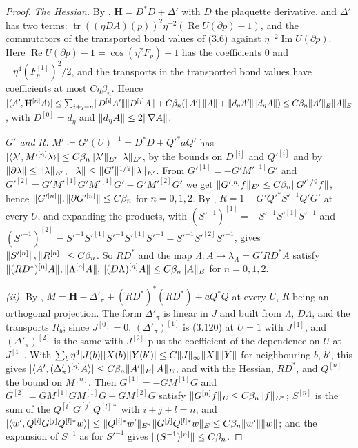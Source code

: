 \documentclass[11pt]{preprint}
\newcommand{\tr}{\operatorname{tr}}
\DeclarePairedDelimiter{\abs}{\lvert}{\rvert}
\DeclarePairedDelimiter{\norm}{\lVert}{\rVert}
\numberwithin{equation}{section}
\theoremstyle{definition}
\theoremstyle{remark}
\theoremstyle{plain}
\begin{document}
\begin{proof}
\emph{The Hessian.} By \cite[(3.10), p.~392]{BalabanPBG}, $\mathbf H = D^*D + \Delta'$ with $D$ the plaquette derivative, and $\Delta'$ has two terms: $\tr((\eta DA)(p))^2\eta^{-2}(\operatorname{Re}U(\partial p) - 1)$, and the commutators of the transported bond values of (3.6) against $\eta^{-2}\operatorname{Im}U(\partial p)$. Here $\operatorname{Re}U(\partial p) - 1 = \cos(\eta^2F_p) - 1$ has the coefficients $0$ and $-\eta^4(F_p^{[1]})^2/2$, and the transports in the transported bond values have coefficients at most $C\eta\beta_n$. Hence $\abs{\langle A', \mathbf H^{[n]}A \rangle} \leq \sum_{i+j=n}\norm{D^{[i]}A'}\norm{D^{[j]}A} + C\beta_n(\norm{A'}\norm{A} + \norm{d_\eta A'}\norm{d_\eta A}) \leq C\beta_n\norm{A'}_E\norm{A}_E$, with $D^{[0]} = d_\eta$ and $\norm{d_\eta A} \leq 2\norm{\nabla A}$.

\emph{$G'$ and $R$.} $M' \coloneqq G'(U)^{-1} = D^*D + Q'^*aQ'$ has $\abs{\langle\lambda', M'^{[n]}\lambda\rangle} \leq C\beta_n\norm{\lambda'}_{E'}\norm{\lambda}_{E'}$, by the bounds on $D^{[i]}$ and $Q'^{[i]}$ and by $\norm{\partial\lambda} \leq \norm{\lambda}_{E'}$, $\norm{\lambda} \leq \norm{G'}^{1/2}\norm{\lambda}_{E'}$. From $G'^{[1]} = -G'M'^{[1]}G'$ and $G'^{[2]} = G'M'^{[1]}G'M'^{[1]}G' - G'M'^{[2]}G'$ we get $\norm{G'^{[n]}f}_{E'} \leq C\beta_n\norm{G'^{1/2}f}$, hence $\norm{G'^{[n]}}, \norm{\partial G'^{[n]}} \leq C\beta_n$ for $n = 0, 1, 2$. By \cite[(3.25), p.~394]{BalabanPBG}, $R = 1 - G'Q'^*S'^{-1}Q'G'$ at every $U$, and expanding the products, with $(S'^{-1})^{[1]} = -S'^{-1}S'^{[1]}S'^{-1}$ and $(S'^{-1})^{[2]} = S'^{-1}S'^{[1]}S'^{-1}S'^{[1]}S'^{-1} - S'^{-1}S'^{[2]}S'^{-1}$, gives $\norm{S'^{[n]}}, \norm{R^{[n]}} \leq C\beta_n$. So $RD^*$ and the map $\Lambda \colon A \mapsto \lambda_A = G'RD^*A$ satisfy $\norm{(RD^*)^{[n]}A}, \norm{\Lambda^{[n]}A}, \norm{(D\Lambda)^{[n]}A} \leq C\beta_n\norm{A}_E$ for $n = 0, 1, 2$.

\emph{(ii).} By \cite[(3.120), (3.122), pp.~419--420]{BalabanPBG}, $M = \mathbf H - \Delta'_\pi + (RD^*)^*(RD^*) + aQ^*Q$ at every $U$, $R$ being an orthogonal projection. The form $\Delta'_\pi$ is linear in $J$ and built from $\Lambda$, $D\Lambda$, and the transports $R_b$; since $J^{[0]} = 0$, $(\Delta'_\pi)^{[1]}$ is (3.120) at $U = 1$ with $J^{[1]}$, and $(\Delta'_\pi)^{[2]}$ is the same with $J^{[2]}$ plus the coefficient of the dependence on $U$ at $J^{[1]}$. With $\sum_b\eta^4\abs{J(b)}\abs{X(b)}\abs{Y(b')} \leq C\norm{J}_\infty\norm{X}\norm{Y}$ for neighbouring $b$, $b'$, this gives $\abs{\langle A', (\Delta'_\pi)^{[n]}A \rangle} \leq C\beta_n\norm{A'}_E\norm{A}_E$, and with the Hessian, $RD^*$, and $Q^{[n]}$ the bound on $M^{[n]}$. Then $G^{[1]} = -GM^{[1]}G$ and $G^{[2]} = GM^{[1]}GM^{[1]}G - GM^{[2]}G$ satisfy $\norm{G^{[n]}f}_E \leq C\beta_n\norm{f}_{E^*}$; $S^{[n]}$ is the sum of the $Q^{[i]}G^{[j]}Q^{[l]*}$ with $i + j + l = n$, and $\abs{\langle w', Q^{[i]}G^{[j]}Q^{[l]*}w \rangle} \leq \norm{Q^{[i]*}w'}_{E^*}\norm{G^{[j]}Q^{[l]*}w}_E \leq C\beta_n\norm{w'}\norm{w}$; and the expansion of $S^{-1}$ as for $S'^{-1}$ gives $\norm{(S^{-1})^{[n]}} \leq C\beta_n$.


\end{proof}
\end{document}
